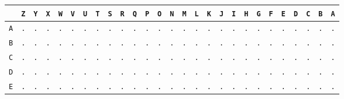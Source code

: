\begin{figure}[H]
	\begin{center}
		\scalebox{0.5} {
			\begin{tabular}{c|cccccccccccccccccccccccccc}
				           & \texttt{Z} & \texttt{Y} & \texttt{X} & \texttt{W} & \texttt{V} & \texttt{U} & \texttt{T} & \texttt{S} & \texttt{R} & \texttt{Q} & \texttt{P} & \texttt{O} & \texttt{N} & \texttt{M} & \texttt{L} & \texttt{K} & \texttt{J} & \texttt{I} & \texttt{H} & \texttt{G} & \texttt{F} & \texttt{E} & \texttt{D} & \texttt{C} & \texttt{B} & \texttt{A} \\ \hline
				\texttt{A} & \texttt{.} & \texttt{.} & \texttt{.} & \texttt{.} & \texttt{.} & \texttt{.} & \texttt{.} & \texttt{.} & \texttt{.} & \texttt{.} & \texttt{.} & \texttt{.} & \texttt{.} & \texttt{.} & \texttt{.} & \texttt{.} & \texttt{.} & \texttt{.} & \texttt{.} & \texttt{.} & \texttt{.} & \texttt{.} & \texttt{.} & \texttt{.} & \texttt{.} & \texttt{.} \\
				\texttt{B} & \texttt{.} & \texttt{.} & \texttt{.} & \texttt{.} & \texttt{.} & \texttt{.} & \texttt{.} & \texttt{.} & \texttt{.} & \texttt{.} & \texttt{.} & \texttt{.} & \texttt{.} & \texttt{.} & \texttt{.} & \texttt{.} & \texttt{.} & \texttt{.} & \texttt{.} & \texttt{.} & \texttt{.} & \texttt{.} & \texttt{.} & \texttt{.} & \texttt{.} & \texttt{.} \\
				\texttt{C} & \texttt{.} & \texttt{.} & \texttt{.} & \texttt{.} & \texttt{.} & \texttt{.} & \texttt{.} & \texttt{.} & \texttt{.} & \texttt{.} & \texttt{.} & \texttt{.} & \texttt{.} & \texttt{.} & \texttt{.} & \texttt{.} & \texttt{.} & \texttt{.} & \texttt{.} & \texttt{.} & \texttt{.} & \texttt{.} & \texttt{.} & \texttt{.} & \texttt{.} & \texttt{.} \\
				\texttt{D} & \texttt{.} & \texttt{.} & \texttt{.} & \texttt{.} & \texttt{.} & \texttt{.} & \texttt{.} & \texttt{.} & \texttt{.} & \texttt{.} & \texttt{.} & \texttt{.} & \texttt{.} & \texttt{.} & \texttt{.} & \texttt{.} & \texttt{.} & \texttt{.} & \texttt{.} & \texttt{.} & \texttt{.} & \texttt{.} & \texttt{.} & \texttt{.} & \texttt{.} & \texttt{.} \\
				\texttt{E} & \texttt{.} & \texttt{.} & \texttt{.} & \texttt{.} & \texttt{.} & \texttt{.} & \texttt{.} & \texttt{.} & \texttt{.} & \texttt{.} & \texttt{.} & \texttt{.} & \texttt{.} & \texttt{.} & \texttt{.} & \texttt{.} & \texttt{.} & \texttt{.} & \texttt{.} & \texttt{.} & \texttt{.} & \texttt{.} & \texttt{.} & \texttt{.} & \texttt{.} & \texttt{.} \\

\end{tabular}}
\end{center}
\end{figure}
